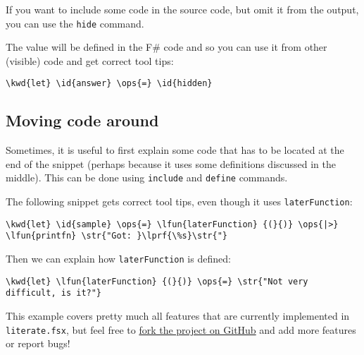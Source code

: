 \documentclass{article}
\newcommand{\id}[1]{\textcolor{black}{#1}}
\newcommand{\kwd}[1]{\textcolor{navy}{#1}}
\newcommand{\ops}[1]{\textcolor{purple}{#1}}
\newcommand{\str}[1]{\textcolor{olive}{#1}}
\begin{document}
If you want to include some code in the source code,
but omit it from the output, you can use the \texttt{hide}
command.


The value will be defined in the F\# code and so you
can use it from other (visible) code and get correct
tool tips:
\begin{Verbatim}[commandchars=\\\{\}]
\kwd{let} \id{answer} \ops{=} \id{hidden}
\end{Verbatim}

\subsection*{Moving code around}



Sometimes, it is useful to first explain some code that
has to be located at the end of the snippet (perhaps
because it uses some definitions discussed in the middle).
This can be done using \texttt{include} and \texttt{define} commands.


The following snippet gets correct tool tips, even though
it uses \texttt{laterFunction}:
\begin{Verbatim}[commandchars=\\\{\}]
\kwd{let} \id{sample} \ops{=} \lfun{laterFunction} {(}{)} \ops{|>} \lfun{printfn} \str{"Got: }\lprf{\%s}\str{"}
\end{Verbatim}



Then we can explain how \texttt{laterFunction} is defined:
\begin{Verbatim}[commandchars=\\\{\}]
\kwd{let} \lfun{laterFunction} {(}{)} \ops{=} \str{"Not very difficult, is it?"}
\end{Verbatim}



This example covers pretty much all features that are
currently implemented in \texttt{literate.fsx}, but feel free
to \href{https://github.com/fsprojects/FSharp.Formatting}{fork the project on GitHub} and add more
features or report bugs!
\end{document}
